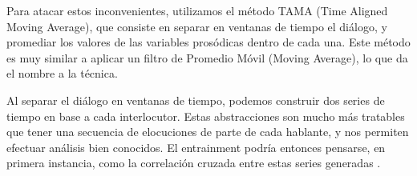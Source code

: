 Para atacar estos inconvenientes, utilizamos el método TAMA (Time Aligned Moving Average), que consiste en separar en ventanas de tiempo el diálogo, y promediar los valores de las variables prosódicas dentro de cada una. Este método es muy similar a aplicar un filtro de Promedio Móvil (Moving Average), lo que da el nombre a la técnica.


Al separar el diálogo en ventanas de tiempo, podemos construir dos series de tiempo en base a cada interlocutor. Estas abstracciones son mucho más tratables que tener una secuencia de elocuciones de parte de cada hablante, y nos permiten efectuar análisis bien conocidos. El entrainment podría entonces pensarse, en primera instancia, como la correlación cruzada entre estas series generadas \cite{CHATFIELD}.

